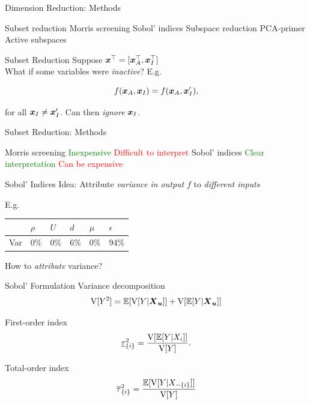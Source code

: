 \documentclass[14pt]{beamer}
\begin{document}
\begin{frame}{Dimension Reduction: Methods}
  \begin{outline}
    \1 Subset reduction
      \2 Morris screening
      \2 Sobol' indices
    \1 Subspace reduction
      \2 PCA-primer
      \2 Active subspaces
  \end{outline}
\end{frame}

\begin{frame}{Subset Reduction}
  Suppose $\boldsymbol{x}^{\top} = [\boldsymbol{x}_A^{\top}, \boldsymbol{x}_I^{\top}]$ \\
  What if some variables were \emph{inactive}? E.g.

  \begin{equation}
    f(\boldsymbol{x}_A, \boldsymbol{x}_I) = f(\boldsymbol{x}_A, \boldsymbol{x}'_I),
  \end{equation}

  \noindent for all $\boldsymbol{x}_I \neq \boldsymbol{x}'_I$. Can then \emph{ignore} $\boldsymbol{x}_I$.
\end{frame}

\begin{frame}{Subset Reduction: Methods}
  \begin{outline}
    \1 Morris screening
      \2 \textcolor{green}{Inexpensive}
      \2 \textcolor{red}{Difficult to interpret}
    \1 Sobol' indices
      \2 \textcolor{green}{Clear interpretation}
      \2 \textcolor{red}{Can be expensive}
  \end{outline}
\end{frame}

\begin{frame}{Sobol' Indices}
  Idea: Attribute \emph{variance in output} $f$ to \emph{different inputs}

  \bigskip E.g.
  \begin{table}
    \centering
    \begin{tabular}{@{}llllll@{}}
     & $\rho$ & $U$ & $d$ & $\mu$ & $\epsilon$\\
    \hline
    Var & 0\% & 0\% & 6\% & 0\% & 94\% \\
    \end{tabular}
  \end{table}

  How to \emph{attribute} variance?
\end{frame}

\begin{frame}{Sobol' Formulation}
  Variance decomposition
  \begin{equation}
    \mathrm{V}[Y^2] = \mathbb{E}[\mathrm{V}[Y|\boldsymbol{X}_{\boldsymbol{u}}]] + \mathrm{V}[\mathbb{E}[Y|\boldsymbol{X}_{\boldsymbol{u}}]]
  \end{equation}

  First-order index
  \begin{equation}
    \underline{\tau}_{\{i\}}^2 = \frac{\mathrm{V}[\mathbb{E}[Y|X_i]]}{\mathrm{V}[Y]}.
  \end{equation}

  Total-order index
  \begin{equation}
    \overline{\tau}_{\{i\}}^2 = \frac{\mathbb{E}[\mathrm{V}[Y|X_{-\{i\}}]]}{\mathrm{V}[Y]}
  \end{equation}
\end{frame}
\end{document}
